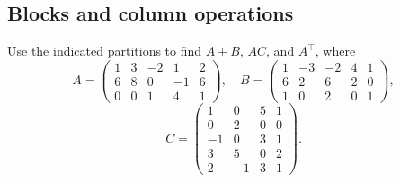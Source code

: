 \subsection*{Blocks and column operations}
\begin{problem}\label{ex:02:block-calculation}
Use the indicated partitions to find $A+B$, $AC$, and $A^\top$, where
\[
A=\left(\begin{array}{rrr|rr}1&3&-2&1&2\\6&8&0&-1&6\\\hline0&0&1&4&1\end{array}\right),
\quad
B=\left(\begin{array}{rrr|rr}1&-3&-2&4&1\\6&2&6&2&0\\\hline1&0&2&0&1\end{array}\right),
\]
\[
C=\left(\begin{array}{rr|rr}1&0&5&1\\0&2&0&0\\-1&0&3&1\\\hline3&5&0&2\\2&-1&3&1\end{array}\right).
\]
\end{problem}
